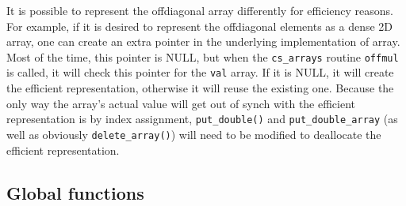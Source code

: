 It is possible to represent the offdiagonal array differently  for
efficiency reasons. For example, if it is desired to represent the
offdiagonal elements as a dense 2D array, one can create an extra
pointer in the underlying implementation of array. Most of the time,
this pointer is NULL, but when the \verb|cs_arrays| routine
\verb|offmul| is called, it will check this pointer for the {\tt val}
array. If it is NULL, it will create the efficient
representation, otherwise it will reuse the existing one. Because the
only way the array's actual value will get out of synch with the
efficient representation is by index assignment, \verb|put_double()|
and \verb|put_double_array| (as well as obviously
\verb|delete_array()|) will need to be modified to deallocate the
efficient representation.

\subsection{Global functions}

